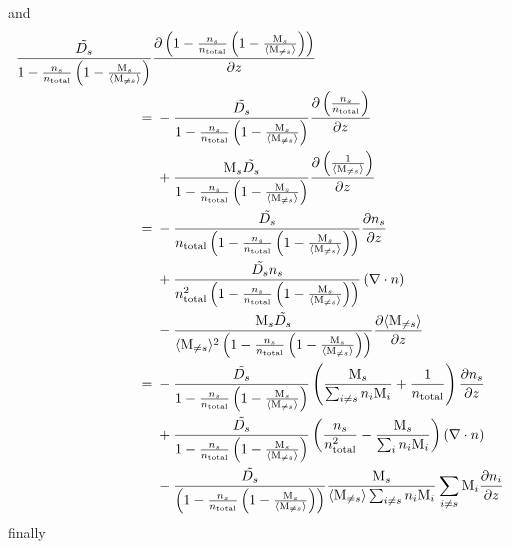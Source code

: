 and
\begin{equation}
\begin{split}
\frac{\tilde{D_s}}{1-\frac{n_s}{n_\text{total}}\left(1 - \frac{\text{M}_s}{\langle\text{M}_{\neq s}\rangle}\right)}
 &  \frac{\partial\left(1-\frac{n_s}{n_\text{total}}\left(1 - \frac{\text{M}_s}{\langle\text{M}_{\neq s}\rangle}\right)\right)}{\partial z} \\
        = &\; - \frac{\tilde{D_s}}{1-\frac{n_s}{n_\text{total}}\left(1 - \frac{\text{M}_s}{\langle\text{M}_{\neq s}\rangle}\right)}
                 \frac{\partial\left(\frac{n_s}{n_\text{total}}\right)}{\partial z}\\
          &\; + \frac{\text{M}_s\tilde{D_s}}{1-\frac{n_s}{n_\text{total}}\left(1 - \frac{\text{M}_s}{\langle\text{M}_{\neq s}\rangle}\right)}
                 \frac{\partial\left(\frac{1}{\langle\text{M}_{\neq s}\rangle}\right)}{\partial z}\\
        = &\; - \frac{\tilde{D_s}}{n_\text{total}\left(1-\frac{n_s}{n_\text{total}}\left(1 - \frac{\text{M}_s}{\langle\text{M}_{\neq s}\rangle}\right)\right)}
                 \frac{\partial n_s}{\partial z}\\
          &\; + \frac{\tilde{D_s}n_s}{n_\text{total}^2\left(1-\frac{n_s}{n_\text{total}}\left(1 - \frac{\text{M}_s}{\langle\text{M}_{\neq s}\rangle}\right)\right)}
                 \left(\nabla\cdot{\ensuremath{n}}\right)\\
          &\; - \frac{\text{M}_s\tilde{D_s}}{\langle\text{M}_{\neq s}\rangle^2\left(1-\frac{n_s}{n_\text{total}}\left(1 - \frac{\text{M}_s}{\langle\text{M}_{\neq s}\rangle}\right)\right)}
                 \frac{\partial\langle\text{M}_{\neq s}\rangle}{\partial z}\\
        = &\; - \frac{\tilde{D_s}}{1-\frac{n_s}{n_\text{total}}\left(1 - \frac{\text{M}_s}{\langle\text{M}_{\neq s}\rangle}\right)}
                  \left( \frac{\text{M}_s}{\sum_{i\neq s}n_i\text{M}_i} + \frac{1}{n_\text{total}}\right)
                 \frac{\partial n_s}{\partial z}\\
          &\; + \frac{\tilde{D_s}}{1-\frac{n_s}{n_\text{total}}\left(1 - \frac{\text{M}_s}{\langle\text{M}_{\neq s}\rangle}\right)}
                \left(\frac{n_s}{n_\text{total}^2} - \frac{\text{M}_s}{\sum_in_i\text{M}_i}\right)
                 \left(\nabla\cdot{\ensuremath{n}}\right)\\
          &\; - \frac{\tilde{D_s}}{\left(1-\frac{n_s}{n_\text{total}}\left(1 - \frac{\text{M}_s}{\langle\text{M}_{\neq s}\rangle}\right)\right)}
                 \frac{\text{M}_s}{\langle\text{M}_{\neq s}\rangle\sum_{i\neq s}n_i\text{M}_i} \sum_{i\neq s} \text{M}_i\frac{\partial n_i}{\partial z} \\
\end{split}
\end{equation}
finally
